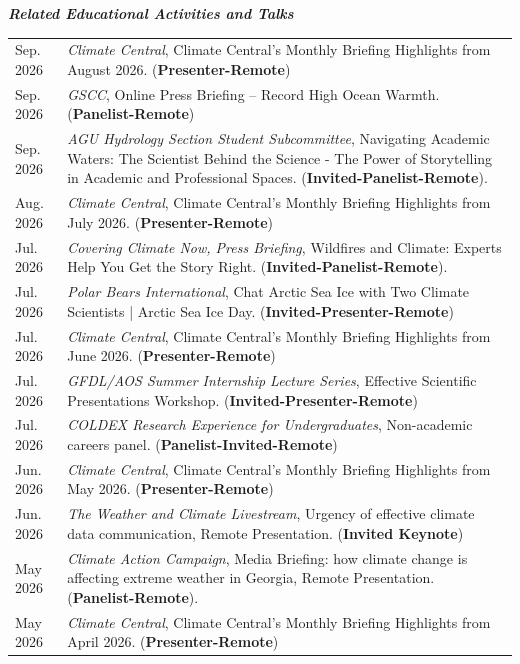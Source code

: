 \documentclass[margin,line,palatino,courier,10pt]{res}
\begin{document}
\begin{resume}
\textit{\textbf{Related Educational Activities and Talks}}
\vspace*{0.05in}\\
\begin{tabular}{@{}p{0.9in}p{4in}}
Sep. 2026 & \textit{Climate Central}, Climate Central's Monthly Briefing Highlights from August 2026. (\textbf{Presenter-Remote})\\
Sep. 2026 & \textit{GSCC}, Online Press Briefing – Record High Ocean Warmth. (\textbf{Panelist-Remote})\\
Sep. 2026 & \textit{AGU Hydrology Section Student Subcommittee}, Navigating Academic Waters: The Scientist Behind the Science - The Power of Storytelling in Academic and Professional Spaces. (\textbf{Invited-Panelist-Remote}).\\
Aug. 2026 & \textit{Climate Central}, Climate Central's Monthly Briefing Highlights from July 2026. (\textbf{Presenter-Remote})\\
Jul. 2026 & \textit{Covering Climate Now, Press Briefing}, Wildfires and Climate: Experts Help You Get the Story Right. (\textbf{Invited-Panelist-Remote}).\\
Jul. 2026 & \textit{Polar Bears International}, Chat Arctic Sea Ice with Two Climate Scientists | Arctic Sea Ice Day. (\textbf{Invited-Presenter-Remote})\\
Jul. 2026 & \textit{Climate Central}, Climate Central's Monthly Briefing Highlights from June 2026. (\textbf{Presenter-Remote})\\
Jul. 2026 & \textit{GFDL/AOS Summer Internship Lecture Series}, Effective Scientific Presentations Workshop. (\textbf{Invited-Presenter-Remote})\\
Jul. 2026 & \textit{COLDEX Research Experience for Undergraduates}, Non-academic careers panel. (\textbf{Panelist-Invited-Remote})\\
Jun. 2026 & \textit{Climate Central}, Climate Central's Monthly Briefing Highlights from May 2026. (\textbf{Presenter-Remote})\\
Jun. 2026 & \textit{The Weather and Climate Livestream}, Urgency of effective climate data communication, Remote Presentation. (\textbf{Invited Keynote})\\
May 2026 & \textit{Climate Action Campaign}, Media Briefing: how climate change is affecting extreme weather in Georgia, Remote Presentation. (\textbf{Panelist-Remote}).\\
May 2026 & \textit{Climate Central}, Climate Central's Monthly Briefing Highlights from April 2026. (\textbf{Presenter-Remote})\\

\end{tabular}
\end{resume}
\end{document}
